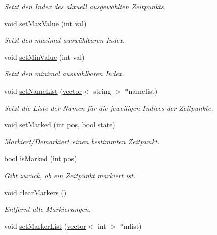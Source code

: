 \begin{DoxyCompactItemize}
\begin{DoxyCompactList}\small\item\em Setzt den Index des aktuell ausgewählten Zeitpunkts. \end{DoxyCompactList}\item 
void \hyperlink{classGUITimeline_a0bb2939f43fcefbeed5dfee827eaca9e}{set\-Max\-Value} (int val)
\begin{DoxyCompactList}\small\item\em Setzt den maximal auswählbaren Index. \end{DoxyCompactList}\item 
void \hyperlink{classGUITimeline_ae75bc611225782e26402896771705821}{set\-Min\-Value} (int val)
\begin{DoxyCompactList}\small\item\em Setzt den minimal auswählbaren Index. \end{DoxyCompactList}\item 
void \hyperlink{classGUITimeline_a115bcd521b18f812b8251a169dbf2454}{set\-Name\-List} (\hyperlink{classstd_1_1vector}{vector}$<$ string $>$ $\ast$namelist)
\begin{DoxyCompactList}\small\item\em Setzt die Liste der Namen für die jeweiligen Indices der Zeitpunkte. \end{DoxyCompactList}\item 
void \hyperlink{classGUITimeline_a81c8e30bdf856cf05dbc9ae32f1b0690}{set\-Marked} (int pos, bool state)
\begin{DoxyCompactList}\small\item\em Markiert/\-Demarkiert einen bestimmten Zeitpunkt. \end{DoxyCompactList}\item 
bool \hyperlink{classGUITimeline_a7d9d402a76a47f7e968c6b5dd84efcb0}{is\-Marked} (int pos)
\begin{DoxyCompactList}\small\item\em Gibt zurück, ob ein Zeitpunkt markiert ist. \end{DoxyCompactList}\item 
void \hyperlink{classGUITimeline_a9ffbeec8aa87350a623e4af4f2aba03d}{clear\-Markers} ()
\begin{DoxyCompactList}\small\item\em Entfernt alle Markierungen. \end{DoxyCompactList}\item 
void \hyperlink{classGUITimeline_aac5565f407354a3b3cfa9071a3486daa}{set\-Marker\-List} (\hyperlink{classstd_1_1vector}{vector}$<$ int $>$ $\ast$mlist)

\end{DoxyCompactItemize}
